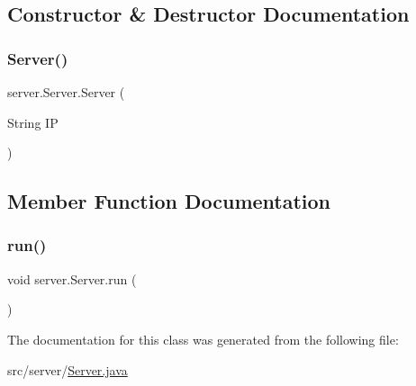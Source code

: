 \subsection{Constructor \& Destructor Documentation}
\mbox{\label{classserver_1_1_server_a0cd54beb5f4b2177f7161d2d7d4b6285}} 
\subsubsection{\texorpdfstring{Server()}{Server()}}
{\footnotesize\ttfamily server.\+Server.\+Server (\begin{DoxyParamCaption}\item[{String}]{IP }\end{DoxyParamCaption})}



\subsection{Member Function Documentation}
\mbox{\label{classserver_1_1_server_a803f3b2a096f160a4070a55085f98c2e}} 
\subsubsection{\texorpdfstring{run()}{run()}}
{\footnotesize\ttfamily void server.\+Server.\+run (\begin{DoxyParamCaption}{ }\end{DoxyParamCaption})}



The documentation for this class was generated from the following file\+:\begin{DoxyCompactItemize}
\item 
src/server/\hyperlink{_server_8java}{Server.\+java}\end{DoxyCompactItemize}
